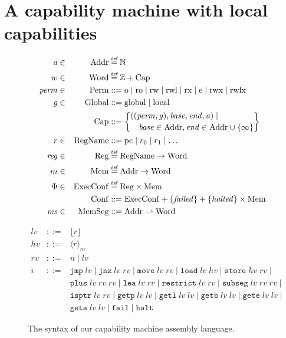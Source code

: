 \documentclass[compsoc,conference,letterpaper,fleqn]{IEEEtran}
\newcommand{\parfun}{\rightharpoonup}
\newcommand{\var}[1]{\mathit{#1}}
\newcommand{\hs}{\var{ms}}
\newcommand{\ms}{\hs}
\newcommand{\hv}{\var{hv}}
\newcommand{\rv}{\var{rv}}
\newcommand{\lv}{\var{lv}}
\newcommand{\gl}{\var{g}}
\newcommand{\pcreg}{\mathrm{pc}}
\newcommand{\addr}{\var{a}}
\newcommand{\start}{\var{base}}
\newcommand{\addrend}{\var{end}}
\newcommand{\reg}{\var{reg}}
\newcommand{\perm}{\var{perm}}
\newcommand{\failed}{\mathit{failed}}
\newcommand{\halted}{\mathit{halted}}
\newcommand{\plaindom}[1]{\mathrm{#1}}
\newcommand{\Caps}{\plaindom{Cap}}
\newcommand{\Words}{\plaindom{Word}}
\newcommand{\Addrs}{\plaindom{Addr}}
\newcommand{\ExecConfs}{\plaindom{ExecConf}}
\newcommand{\RegName}{\plaindom{RegName}}
\newcommand{\Regs}{\plaindom{Reg}}
\newcommand{\Heaps}{\plaindom{Mem}}
\newcommand{\HeapSegments}{\plaindom{MemSeg}}
\newcommand{\MemSegments}{\HeapSegments}
\newcommand{\Confs}{\plaindom{Conf}}
\newcommand{\nats}{\mathbb{N}}
\newcommand{\ints}{\mathbb{Z}}
\newcommand{\Perms}{\plaindom{Perm}}
\newcommand{\Globals}{\plaindom{Global}}
\newcommand{\refreg}[1]{\lfloor #1 \rfloor}
\newcommand{\refheap}[1]{\langle #1 \rangle_m}
\newcommand{\zinstr}[1]{\mathtt{#1}}
\newcommand{\fail}{\zinstr{fail}}
\newcommand{\halt}{\zinstr{halt}}
\newcommand{\oneinstr}[2]{\zinstr{#1} \; #2}
\newcommand{\jmp}[1]{\oneinstr{jmp}{#1}}
\newcommand{\twoinstr}[3]{\zinstr{#1} \; #2 \; #3}
\newcommand{\restricttwo}[2]{\twoinstr{restrict}{#1}{#2}}
\newcommand{\jnz}[2]{\twoinstr{jnz}{#1}{#2}}
\newcommand{\isptr}[2]{\twoinstr{isptr}{#1}{#2}}
\newcommand{\geta}[2]{\twoinstr{geta}{#1}{#2}}
\newcommand{\getb}[2]{\twoinstr{getb}{#1}{#2}}
\newcommand{\gete}[2]{\twoinstr{gete}{#1}{#2}}
\newcommand{\getp}[2]{\twoinstr{getp}{#1}{#2}}
\newcommand{\getl}[2]{\twoinstr{getl}{#1}{#2}}
\newcommand{\move}[2]{\twoinstr{move}{#1}{#2}}
\newcommand{\store}[2]{\twoinstr{store}{#1}{#2}}
\newcommand{\load}[2]{\twoinstr{load}{#1}{#2}}
\newcommand{\lea}[2]{\twoinstr{lea}{#1}{#2}}
\newcommand{\threeinstr}[4]{\zinstr{#1} \; #2 \; #3 \; #4}
\newcommand{\subseg}[3]{\threeinstr{subseg}{#1}{#2}{#3}}
\newcommand{\plus}[3]{\threeinstr{plus}{#1}{#2}{#3}}
\newcommand{\plainperm}[1]{\mathrm{#1}}
\newcommand{\noperm}{\plainperm{o}}
\newcommand{\readonly}{\plainperm{ro}}
\newcommand{\readwrite}{\plainperm{rw}}
\newcommand{\exec}{\plainperm{rx}}
\newcommand{\entry}{\plainperm{e}}
\newcommand{\rwx}{\plainperm{rwx}}
\newcommand{\readwritel}{\plainperm{rwl}}
\newcommand{\rwlx}{\plainperm{rwlx}}
\newcommand{\local}{\plainperm{local}}
\newcommand{\glob}{\plainperm{global}}
\newcommand{\isdef}{\mathrel{\overset{\makebox[0pt]{\mbox{\normalfont\tiny\sffamily def}}}{=}}}
\newcommand\bnfdef{\mathrel{::=}}
\begin{document}
\section{A capability machine with local capabilities}
\begin{figure}
  \begin{align*}
    \addr   &\in& \Addrs &\isdef \nats\\
    w &\in&\Words &\isdef \ints + \Caps \\
    \perm   &\in& \Perms &::= \noperm \mid \readonly\mid \readwrite\mid \readwritel\mid \exec\mid \entry\mid \rwx\mid \rwlx\\
    \gl&\in&\Globals & ::= \glob \mid \local \\
     && \Caps  &::= \left\{
                       \begin{multlined}
                         ((\perm,\gl),\start,\addrend,\addr)\mid\\
                         \start\in\Addrs,\addrend \in
                         \Addrs\cup \{\infty\}
                       \end{multlined} \right\}\\
    r       &\in& \RegName&\bnfdef \pcreg\mid r_0\mid r_1\mid\ldots\\
    \reg &\in& \Regs  &\isdef \RegName \rightarrow \Words\\
    m&\in& \Heaps &\isdef \Addrs \rightarrow \Words \\
    \Phi    &\in& \ExecConfs  &\isdef \Regs \times \Heaps \\
    &&\Confs &::= \ExecConfs + \{\failed \} + \{\halted\} \times \Heaps \\
    \ms     &\in& \MemSegments &::= \Addrs \parfun \Words
  \end{align*}

  \begin{equation*}
  \begin{array}{rcl}
    \lv    &::=& \refreg{r} \\
    \hv    &::=& \refheap{r}\\
    \rv    &::=& n \mid \lv \\
    i      &::=& 
                 \jmp{\lv} \mid 
                 \jnz{\lv}{\rv} \mid
                 \move{\lv}{\rv} \mid 
                 \load{\lv}{\hv} \mid 
                 \store{\hv}{\rv} \mid  \\
           &   & \plus{\lv}{\rv}{\rv} \mid 
                 \lea{\lv}{\rv} \mid 
                 \restricttwo{\lv}{\rv} \mid 
                 \subseg{\lv}{\rv}{\rv} \mid  \\
           &   & \isptr{\lv}{\rv} \mid 
                 \getp{\lv}{\lv} \mid 
                 \getl{\lv}{\lv} \mid 
                 \getb{\lv}{\lv} \mid
                 \gete{\lv}{\lv} \mid\\
           &   & \geta{\lv}{\lv} \mid 
                 \fail \mid
                 \halt 
  \end{array}
\end{equation*}
  \caption{The syntax of our capability machine assembly language.}
  \label{fig:syntax}
\end{figure}
\end{document}

